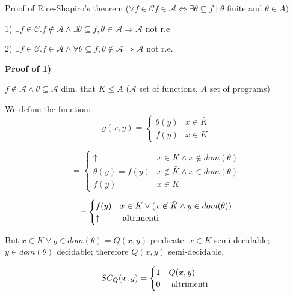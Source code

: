 \documentclass{amsbook}
\theoremstyle{definition}
\theoremstyle{remark}
\numberwithin{section}{chapter}
\numberwithin{equation}{chapter}
\begin{document}
Proof of Rice-Shapiro's theorem ($ \forall f \in \mathcal{C} f \in \mathcal{A} \Leftrightarrow \exists\theta\subseteq f \mid \theta $ finite and $ \theta\in A) $

1) $ \exists f \in \mathcal{C}. f \not\in \mathcal{A} \land \exists\theta\subseteq f, \theta\in\mathcal{A} \Rightarrow \mathcal{A}$ not r.e

2) $ \exists f \in \mathcal{C}. f\in\mathcal{A} \land \forall\theta\subseteq f, \theta\not\in\mathcal{A}\Rightarrow \mathcal{A} $ not r.e.

\textbf{Proof of 1)}

$ f\not\in \mathcal{A} \land \theta\subseteq \mathcal{A}$ dim. that $ \bar{K}\leq A $ ($ \mathcal{A} $ set of functions, $A$ set of programs)

We define the function:
\begin{equation*}
	g(x,y) = \begin{cases}
		\theta(y) & x \in \bar{K} \\
		f(y)      & x \in K
	\end{cases}
\end{equation*}

\begin{equation*}
	= \begin{cases}
		\uparrow         & x \in \bar{K} \land x \not\in dom(\theta) \\
		\theta(y) = f(y) & x \not\in \bar{K} \land x \in dom(\theta) \\
		f(y)             & x\in K
	\end{cases}
\end{equation*}

\begin{equation*}
	= \begin{cases}
		f(y)     & x\in K\lor(x\not\in\bar{K}\land y\in dom(\theta)) \\
		\uparrow & $ altrimenti $
	\end{cases}
\end{equation*}

But $ x\in K\lor y\in dom(\theta) = Q(x,y)$ predicate. $ x\in K $ semi-decidable; $ y \in dom(\theta) $ decidable; therefore $ Q(x,y) $ semi-decidable.

\begin{equation*}
	SC_Q(x,y) = \begin{cases}
		1 & Q(x,y)         \\
		0 & $ altrimenti $
	\end{cases}
\end{equation*}
\end{document}
